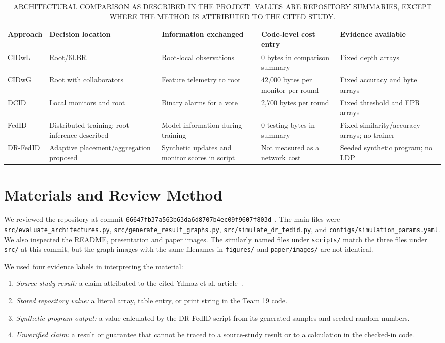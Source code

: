\documentclass[conference]{IEEEtran}
\begin{document}
\begin{table}[htbp]
\centering
\caption{ARCHITECTURAL COMPARISON AS DESCRIBED IN THE PROJECT. VALUES ARE REPOSITORY SUMMARIES, EXCEPT WHERE THE METHOD IS ATTRIBUTED TO THE CITED STUDY.}
\label{tab:arch_comparison}
\begin{tabular}{p{1.8cm}p{3.2cm}p{3.4cm}p{3.2cm}p{3.8cm}}
\toprule
\textbf{Approach} & \textbf{Decision location} & \textbf{Information exchanged} & \textbf{Code-level cost entry} & \textbf{Evidence available} \\
\midrule
CIDwL & Root/6LBR & Root-local observations & 0 bytes in comparison summary & Fixed depth arrays \\
CIDwG & Root with collaborators & Feature telemetry to root & 42,000 bytes per monitor per round & Fixed accuracy and byte arrays \\
DCID & Local monitors and root & Binary alarms for a vote & 2,700 bytes per round & Fixed threshold and FPR arrays \\
FedID & Distributed training; root inference described & Model information during training & 0 testing bytes in summary & Fixed similarity/accuracy arrays; no trainer \\
DR-FedID & Adaptive placement/aggregation proposed & Synthetic updates and monitor scores in script & Not measured as a network cost & Seeded synthetic program; no LDP \\
\bottomrule
\end{tabular}
\end{table}

\section{Materials and Review Method}
We reviewed the repository at commit \texttt{66647fb37a563b63da6d8707b4ec09f9607f803d}~\cite{patel2026repository}. The main files were \texttt{src/evaluate\_architectures.py}, \texttt{src/generate\_result\_graphs.py}, \texttt{src/simulate\_dr\_fedid.py}, and \texttt{configs/simulation\_params.yaml}. We also inspected the README, presentation and paper images. The similarly named files under \texttt{scripts/} match the three files under \texttt{src/} at this commit, but the graph images with the same filenames in \texttt{figures/} and \texttt{paper/images/} are not identical.

We used four evidence labels in interpreting the material:
\begin{enumerate}
    \item \textit{Source-study result:} a claim attributed to the cited Y{\i}lmaz et al. article~\cite{yilmaz2025exploring}.
    \item \textit{Stored repository value:} a literal array, table entry, or print string in the Team 19 code.
    \item \textit{Synthetic program output:} a value calculated by the DR-FedID script from its generated samples and seeded random numbers.
    \item \textit{Unverified claim:} a result or guarantee that cannot be traced to a source-study result or to a calculation in the checked-in code.
\end{enumerate}
\end{document}

